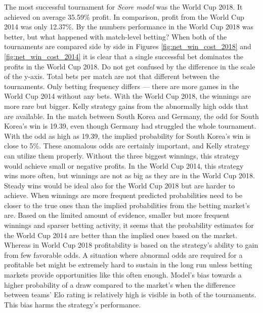 The most successful tournament for \textit{Score model} was the World Cup 2018. It achieved on average 35.59\% profit. In comparison, profit from the World Cup 2014 was only 12.37\%. By the numbers performance in the World Cup 2018 was better, but what happened with match-level betting? When both of the tournaments are compared side by side in Figures \ref{fig:net_win_cost_2018} and \ref{fig:net_win_cost_2014} it is clear that a single successful bet dominates the profits in the World Cup 2018. Do not get confused by the difference in the scale of the y-axis. Total bets per match are not that different between the tournaments. Only betting frequency differs --- there are more games in the World Cup 2014 without any bets. With the World Cup 2018, the winnings are more rare but bigger. Kelly strategy gains from the abnormally high odds that are available. In the match between South Korea and Germany, the odd for South Korea's win is 19.39, even though Germany had struggled the whole tournament. With the odd as high as 19.39, the implied probability for South Korea's win is close to 5\%. These anomalous odds are certainly important, and Kelly strategy can utilize them properly. Without the three biggest winnings, this strategy would achieve small or negative profits. In the World Cup 2014, this strategy wins more often, but winnings are not as big as they are in the World Cup 2018. Steady wins would be ideal also for the World Cup 2018 but are harder to achieve. When winnings are more frequent predicted probabilities need to be closer to the true ones than the implied probabilities from the betting market's are. Based on the limited amount of evidence, smaller but more frequent winnings and sparser betting activity, it seems that the probability estimates for the World Cup 2014 are better than the implied ones based on the market. Whereas in World Cup 2018 profitability is based on the strategy's ability to gain from few favorable odds. A situation where abnormal odds are required for a profitable bet might be extremely hard to sustain in the long run unless betting markets provide opportunities like this often enough. Model's bias towards a higher probability of a draw compared to the market's when the difference between teams' Elo rating is relatively high is visible in both of the tournaments. This bias harms the strategy's performance.

